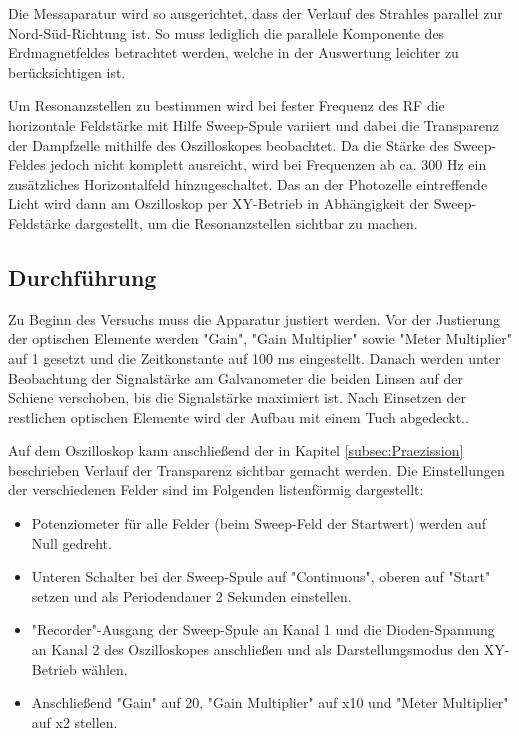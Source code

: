 Die Messaparatur wird so ausgerichtet, dass der Verlauf des Strahles parallel
zur Nord-Süd-Richtung ist. So muss lediglich die parallele Komponente des Erdmagnetfeldes
betrachtet werden, welche in der Auswertung leichter zu berücksichtigen ist.

Um Resonanzstellen zu bestimmen wird bei fester Frequenz des RF die horizontale
Feldstärke mit Hilfe Sweep-Spule variiert und dabei die Transparenz der Dampfzelle
mithilfe des Oszilloskopes beobachtet. Da die Stärke des Sweep-Feldes jedoch
nicht komplett ausreicht, wird bei Frequenzen ab ca. 300 Hz ein zusätzliches
Horizontalfeld hinzugeschaltet. Das an der Photozelle
eintreffende Licht wird dann
am Oszilloskop per XY-Betrieb in Abhängigkeit der Sweep-Feldstärke dargestellt,
um die Resonanzstellen sichtbar zu machen.

\subsection{Durchführung}
\label{subsec:Durchführung}

Zu Beginn des Versuchs muss die Apparatur justiert werden. Vor der Justierung
der optischen Elemente werden "Gain", "Gain Multiplier" sowie "Meter Multiplier"
auf 1 gesetzt und die Zeitkonstante auf 100 ms eingestellt.
Danach werden unter Beobachtung der
Signalstärke am Galvanometer die beiden Linsen auf der Schiene verschoben, bis
die Signalstärke maximiert ist. Nach Einsetzen der restlichen optischen Elemente
wird der Aufbau mit einem Tuch abgedeckt..

Auf dem Oszilloskop kann anschließend der in Kapitel
\ref{subsec:Praezission} beschrieben Verlauf der Transparenz sichtbar gemacht
werden. Die Einstellungen der verschiedenen Felder sind im Folgenden listenförmig
dargestellt:

\begin{itemize}
  \item Potenziometer für alle Felder (beim Sweep-Feld der Startwert) werden auf
  Null gedreht.
  \item Unteren Schalter bei der Sweep-Spule auf "Continuous", oberen auf "Start"
  setzen und als Periodendauer 2 Sekunden einstellen.
  \item  "Recorder"-Ausgang der Sweep-Spule an Kanal 1 und die Dioden-Spannung an
  Kanal 2 des Oszilloskopes anschließen und als Darstellungsmodus den XY-Betrieb
  wählen.
  \item Anschließend "Gain" auf 20, "Gain Multiplier" auf x10 und "Meter Multiplier"
  auf x2 stellen.
\end{itemize}

